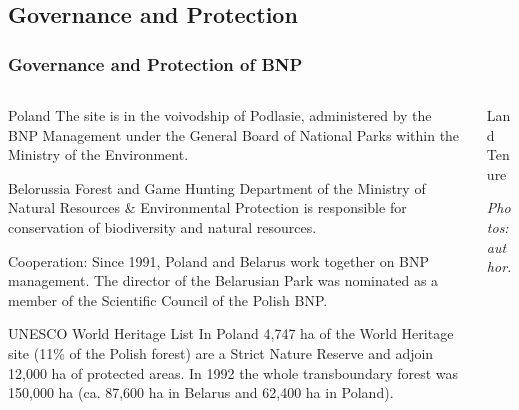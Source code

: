 \documentclass[pdflatex,compress,8pt,
	xcolor={dvipsnames,dvipsnames,svgnames,x11names,table},
	hyperref={colorlinks = true,
	breaklinks = true, urlcolor = NavyBlue, breaklinks = true}]{beamer}
\begin{document}
\subsection{Governance and Protection}
\begin{frame}\frametitle{Governance and Protection of BNP}

\begin{minipage}[0.4\textheight]{\textwidth}
\begin{columns}[T]
\begin{column}{0.7\textwidth}
\vspace{4em} 
\begin{alertblock}{Poland}
The site is in the voivodship of Podlasie, administered by the BNP Management under the General Board of National Parks within the Ministry of the Environment.
\end{alertblock}

\begin{block}{Belorussia}
Forest and Game Hunting Department of the Ministry of Natural Resources \& Environmental Protection is responsible for conservation of biodiversity and natural resources. 
\end{block}

\begin{examples}{Cooperation:}
Since 1991, Poland and Belarus work together on BNP management. The director of the Belarusian Park was nominated as a member of the Scientific Council of the Polish BNP.
\end{examples}

\begin{block}{UNESCO World Heritage List}
In Poland 4,747 ha of the World Heritage site (11\% of the Polish forest) are a Strict Nature Reserve and adjoin 12,000 ha of protected areas. In 1992 the whole transboundary forest was 150,000 ha (ca. 87,600 ha in Belarus and 62,400 ha in Poland).
\end{block}

\end{column}
\begin{column}{0.3\textwidth}
\vspace{4em}
Land Tenure
\begin{figure}[H]
	\centering
			\vspace{2mm}
			\vspace{2mm}
\end{figure}
\scriptsize{\emph{Photos: author.}}
\end{column}
\end{columns}
\end{minipage}
\end{frame}
\end{document}
